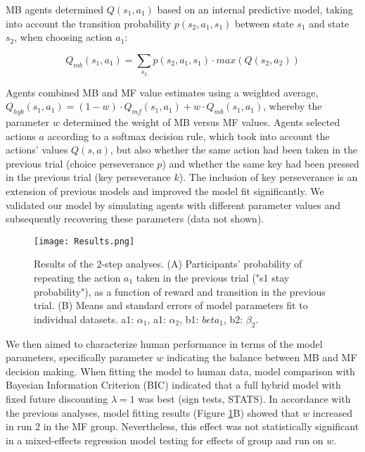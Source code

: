 \documentclass[11pt]{article} %
\begin{document}
MB agents determined $Q(s_{1}, a_{1})$ based on an internal predictive model, taking into account the transition probability $p(s_{2}, a_{1}, s_{1})$ between state $s_{1}$ and state $s_{2}$, when choosing action $a_{1}$:

\begin{equation}
Q_{mb}(s_{1}, a_{1}) = \sum_{s_{2}} p(s_{2}, a_{1}, s_{1}) \cdot max(Q(s_{2}, a_{2}))
\end{equation}

Agents combined MB and MF value estimates using a weighted average, $Q_{hyb}(s_{1}, a_{1}) = (1 - w) \cdot Q_{mf}(s_{1}, a_{1}) + w \cdot Q_{mb}(s_{1}, a_{1})$, whereby the parameter $w$ determined the weight of MB versus MF values. Agents selected actions $a$ according to a softmax decision rule, which took into account the actions' values $Q(s, a)$, but also whether the same action had been taken in the previous trial (choice perseverance $p$) and whether the same key had been pressed in the previous trial (key perseverance $k$). The inclusion of key perseverance is an extension of previous models and improved the model fit significantly. %
We validated our model by simulating agents with different parameter values and subsequently recovering these parameters (data not shown). %

\begin{figure}
	\texttt{[image: Results.png]}
	\caption{Results of the 2-step analyses. (A) Participants' probability of repeating the action $a_{1}$ taken in the previous trial ("s1 stay probability"), as a function of reward and transition in the previous trial. (B) Means and standard errors of model parameters fit to individual datasets. a1: $\alpha_{1}$, a1: $\alpha_{2}$, b1: $beta_{1}$, b2: $\beta_{2}$.}
	\label{Results}
\end{figure}

We then aimed to characterize human performance in terms of the model parameters, specifically parameter $w$ indicating the balance between MB and MF decision making. When fitting the model to human data, model comparison with Bayesian Information Criterion (BIC) indicated that a full hybrid model with fixed future discounting $\lambda=1$ was best (sign tests, STATS). %
In accordance with the previous analyses, model fitting results (Figure \ref{Results}B) showed that $w$ increased in run 2 in the MF group. Nevertheless, this effect was not statistically significant in a mixed-effects regression model testing for effects of group and run on $w$.
\end{document}
